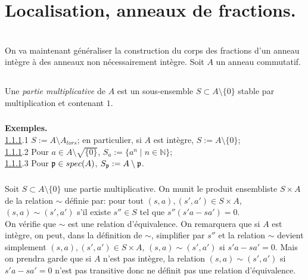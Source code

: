 \documentclass[a4paper, 12pt]{amsart}
\newcommand{\N}{\mathbb{N}}
\begin{document}
 

 
\section{Localisation, anneaux de fractions.}\textit{}\\
\noindent On va maintenant généraliser la construction du corps des fractions d'un anneau intègre à des anneaux non nécessairement intègre. Soit $A$ un anneau commutatif. 

\subsection{}Une \textit{partie multiplicative}   de $A$ est un sous-ensemble $S\subset A\setminus\lbrace 0\rbrace$ stable par multiplication et contenant $1$. \\

\subsubsection{}\label{LocEx1}\textbf{Exemples.}\\

\noindent\ref{LocEx1}.1 $S:=A\setminus A_{tors}$; en particulier, si $A$ est intègre, $S:=A\setminus\lbrace 0\rbrace$;\\

\noindent\ref{LocEx1}.2 Pour $a\in A\setminus \sqrt{\lbrace 0\rbrace}$, $S_a:=\lbrace a^n\;|\; n\in\N\rbrace$;\\

\noindent\ref{LocEx1}.3 Pour $\frak{p}\in spec(A)$, $S_{\frak{p}}:=A\setminus \frak{p}$.


\subsubsection{}\label{LocDef} Soit $S\subset A\setminus\lbrace 0\rbrace$ une partie multiplicative. On munit le produit ensembliste $S\times A$ de la relation $\sim $ définie par: pour tout $(s,a),(s',a')\in S\times A$, $(s,a)\sim (s',a')$ s'il existe $s''\in S$ tel que $s''(s'a-sa')=0$. \\

\noindent On vérifie que $\sim$ est une relation d'équivalence. On remarquera que si $A$ est intègre, on peut, dans la définition de $\sim$, simplifier par $s''$ et la relation $\sim$ devient simplement $(s,a),(s',a')\in S\times A$, $(s,a)\sim (s',a')$ si $s'a-sa'=0$.  Mais on prendra garde que si $A$ n'est pas intègre,  la relation $(s,a)\sim (s',a')$ si $s'a-sa'=0$ n'est pas transitive donc ne définit pas une relation d'équivalence.\\
\end{document}
